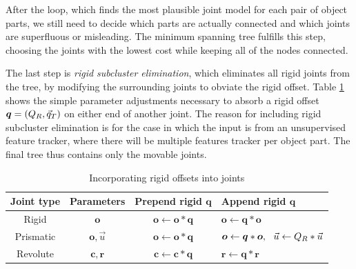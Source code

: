 \documentclass[letterpaper, 10 pt, conference]{ieeeconf}  %
\def\xmat{\uppercase}    \def\xmatstr{in uppercase}
\def\xvec{\vec}          \def\xvecstr{with an arrow}
\def\xse{\bm}            \def\xsestr{in boldface}
\begin{document}
After the loop, which finds the most plausible joint model for each pair of object parts, we still need to decide which parts are actually connected and which joints are superfluous or misleading. The minimum spanning tree fulfills this step, choosing the joints with the lowest cost while keeping all of the nodes connected.

The last step is \emph{rigid subcluster elimination}, which eliminates all rigid joints from the tree, by modifying the surrounding joints to obviate the rigid offset. Table \ref{tbl:move} shows the simple parameter adjustments necessary to absorb a rigid offset $\xse{q} = (\xmat{q}_R, \xvec{q}_T)$ on either end of another joint. The reason for including rigid subcluster elimination is for the case in which the input is from an unsupervised feature tracker, where there will be multiple features tracker per object part. The final tree thus contains only the movable joints.

\begin{table}[ht]
  \begin{tabular}{c|c|c|l}
    Joint type & Parameters & Prepend rigid $\xse{q}$ & Append rigid $\xse{q}$ \\
    \hline
    Rigid & $\xse{o}$ & $\xse{o} \leftarrow \xse{o}*\xse{q}$ & $\xse{o} \leftarrow \xse{q}*\xse{o}$ \\
    Prismatic & $\xse{o}, \xvec{u}$ & $\xse{o} \leftarrow \xse{o}*\xse{q}$ & $\xse{o} \leftarrow \xse{q}*\xse{o},~ ~ \xvec{u} \leftarrow \xmat{q}_R*\xvec{u}$ \\
    Revolute & $\xse{c}, \xse{r}$ & $\xse{c} \leftarrow \xse{c}*\xse{q}$ & $\xse{r} \leftarrow \xse{q}*\xse{r}$ \\
  \end{tabular}
  \caption{Incorporating rigid offsets into joints}
  \label{tbl:move}
\end{table}
\end{document}
